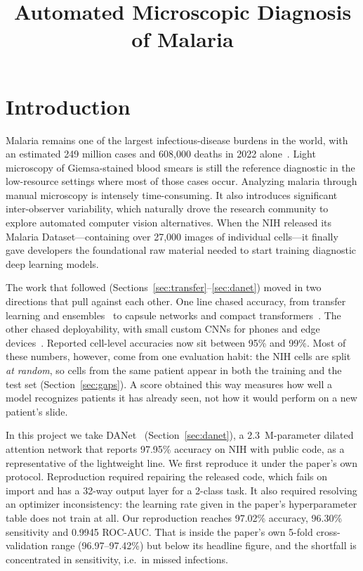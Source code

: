 \documentclass[conference]{IEEEtran}
\begin{document}
\title{Automated Microscopic Diagnosis of Malaria}

\author{
\and
{}}

\maketitle

\section{Introduction}
Malaria remains one of the largest infectious-disease burdens in the world, with an
estimated 249 million cases and 608{,}000 deaths in 2022 alone~\cite{who2023}. Light
microscopy of Giemsa-stained blood smears is still the reference diagnostic in the
low-resource settings where most of those cases occur.
Analyzing malaria through manual microscopy is intensely time-consuming. It also
introduces significant inter-observer variability, which naturally drove the research
community to explore automated computer vision alternatives. When the NIH released its
Malaria Dataset---containing over 27,000 images of individual cells---it finally gave
developers the foundational raw material needed to start training diagnostic deep
learning models.

The work that followed (Sections~\ref{sec:transfer}--\ref{sec:danet}) moved in
two directions that pull against each other. One line chased accuracy, from transfer
learning and ensembles~\cite{rajaraman2018,rajaraman2019} to capsule networks and
compact transformers~\cite{madhu2023,masud2022}. The other chased deployability, with
small custom CNNs for phones and edge devices~\cite{rahman2019,fuhad2020,masud2020}.
Reported cell-level accuracies now sit between 95\% and 99\%. Most of these numbers,
however, come from one evaluation habit: the NIH cells are split \emph{at random},
so cells from the same patient appear in both the training and the test set
(Section~\ref{sec:gaps}). A score obtained this way measures how well a model
recognizes patients it has already seen, not how it would perform on a new patient's
slide.

In this project we take DANet~\cite{ali2025danet} (Section~\ref{sec:danet}), a 2.3~M-parameter dilated attention
network that reports 97.95\% accuracy on NIH with public code, as a representative of
the lightweight line. We first reproduce it under the paper's own protocol.
Reproduction required repairing the released code, which fails on import and has a
32-way output layer for a 2-class task. It also required resolving an optimizer
inconsistency: the learning rate given in the paper's hyperparameter table does not
train at all. Our reproduction reaches 97.02\% accuracy, 96.30\% sensitivity and
0.9945 ROC-AUC. That is inside the paper's own 5-fold cross-validation range
(96.97--97.42\%) but below its headline figure, and the shortfall is concentrated in
sensitivity, i.e.\ in missed infections.
\end{document}

